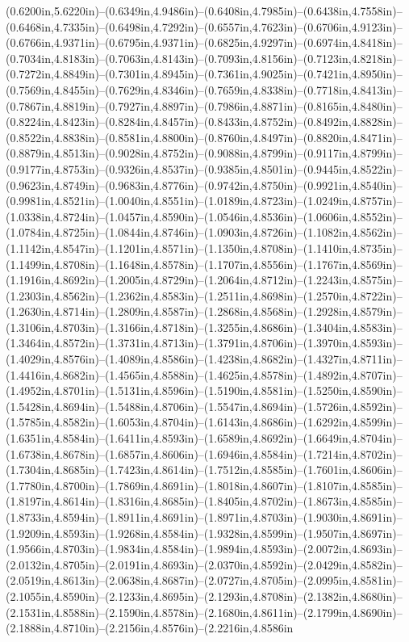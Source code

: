 (0.6200in,5.6220in)--(0.6349in,4.9486in)--(0.6408in,4.7985in)--(0.6438in,4.7558in)--(0.6468in,4.7335in)--(0.6498in,4.7292in)--(0.6557in,4.7623in)--(0.6706in,4.9123in)--(0.6766in,4.9371in)--(0.6795in,4.9371in)--(0.6825in,4.9297in)--(0.6974in,4.8418in)--(0.7034in,4.8183in)--(0.7063in,4.8143in)--(0.7093in,4.8156in)--(0.7123in,4.8218in)--(0.7272in,4.8849in)--(0.7301in,4.8945in)--(0.7361in,4.9025in)--(0.7421in,4.8950in)--(0.7569in,4.8455in)--(0.7629in,4.8346in)--(0.7659in,4.8338in)--(0.7718in,4.8413in)--(0.7867in,4.8819in)--(0.7927in,4.8897in)--(0.7986in,4.8871in)--(0.8165in,4.8480in)--(0.8224in,4.8423in)--(0.8284in,4.8457in)--(0.8433in,4.8752in)--(0.8492in,4.8828in)--(0.8522in,4.8838in)--(0.8581in,4.8800in)--(0.8760in,4.8497in)--(0.8820in,4.8471in)--(0.8879in,4.8513in)--(0.9028in,4.8752in)--(0.9088in,4.8799in)--(0.9117in,4.8799in)--(0.9177in,4.8753in)--(0.9326in,4.8537in)--(0.9385in,4.8501in)--(0.9445in,4.8522in)--(0.9623in,4.8749in)--(0.9683in,4.8776in)--(0.9742in,4.8750in)--(0.9921in,4.8540in)--(0.9981in,4.8521in)--(1.0040in,4.8551in)--(1.0189in,4.8723in)--(1.0249in,4.8757in)--(1.0338in,4.8724in)--(1.0457in,4.8590in)--(1.0546in,4.8536in)--(1.0606in,4.8552in)--(1.0784in,4.8725in)--(1.0844in,4.8746in)--(1.0903in,4.8726in)--(1.1082in,4.8562in)--(1.1142in,4.8547in)--(1.1201in,4.8571in)--(1.1350in,4.8708in)--(1.1410in,4.8735in)--(1.1499in,4.8708in)--(1.1648in,4.8578in)--(1.1707in,4.8556in)--(1.1767in,4.8569in)--(1.1916in,4.8692in)--(1.2005in,4.8729in)--(1.2064in,4.8712in)--(1.2243in,4.8575in)--(1.2303in,4.8562in)--(1.2362in,4.8583in)--(1.2511in,4.8698in)--(1.2570in,4.8722in)--(1.2630in,4.8714in)--(1.2809in,4.8587in)--(1.2868in,4.8568in)--(1.2928in,4.8579in)--(1.3106in,4.8703in)--(1.3166in,4.8718in)--(1.3255in,4.8686in)--(1.3404in,4.8583in)--(1.3464in,4.8572in)--(1.3731in,4.8713in)--(1.3791in,4.8706in)--(1.3970in,4.8593in)--(1.4029in,4.8576in)--(1.4089in,4.8586in)--(1.4238in,4.8682in)--(1.4327in,4.8711in)--(1.4416in,4.8682in)--(1.4565in,4.8588in)--(1.4625in,4.8578in)--(1.4892in,4.8707in)--(1.4952in,4.8701in)--(1.5131in,4.8596in)--(1.5190in,4.8581in)--(1.5250in,4.8590in)--(1.5428in,4.8694in)--(1.5488in,4.8706in)--(1.5547in,4.8694in)--(1.5726in,4.8592in)--(1.5785in,4.8582in)--(1.6053in,4.8704in)--(1.6143in,4.8686in)--(1.6292in,4.8599in)--(1.6351in,4.8584in)--(1.6411in,4.8593in)--(1.6589in,4.8692in)--(1.6649in,4.8704in)--(1.6738in,4.8678in)--(1.6857in,4.8606in)--(1.6946in,4.8584in)--(1.7214in,4.8702in)--(1.7304in,4.8685in)--(1.7423in,4.8614in)--(1.7512in,4.8585in)--(1.7601in,4.8606in)--(1.7780in,4.8700in)--(1.7869in,4.8691in)--(1.8018in,4.8607in)--(1.8107in,4.8585in)--(1.8197in,4.8614in)--(1.8316in,4.8685in)--(1.8405in,4.8702in)--(1.8673in,4.8585in)--(1.8733in,4.8594in)--(1.8911in,4.8691in)--(1.8971in,4.8703in)--(1.9030in,4.8691in)--(1.9209in,4.8593in)--(1.9268in,4.8584in)--(1.9328in,4.8599in)--(1.9507in,4.8697in)--(1.9566in,4.8703in)--(1.9834in,4.8584in)--(1.9894in,4.8593in)--(2.0072in,4.8693in)--(2.0132in,4.8705in)--(2.0191in,4.8693in)--(2.0370in,4.8592in)--(2.0429in,4.8582in)--(2.0519in,4.8613in)--(2.0638in,4.8687in)--(2.0727in,4.8705in)--(2.0995in,4.8581in)--(2.1055in,4.8590in)--(2.1233in,4.8695in)--(2.1293in,4.8708in)--(2.1382in,4.8680in)--(2.1531in,4.8588in)--(2.1590in,4.8578in)--(2.1680in,4.8611in)--(2.1799in,4.8690in)--(2.1888in,4.8710in)--(2.2156in,4.8576in)--(2.2216in,4.8586in